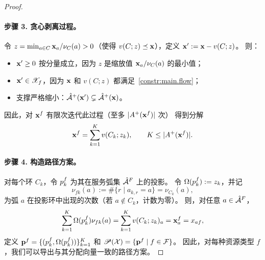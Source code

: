 \begin{proof}
\paragraph{步骤 3. 贪心剥离过程。}
令 $z=\min_{a\in C}\assignmentVector_a/\nu_{C}(a)>0$（使得 $v(C;z)\vectorLe \assignmentVector$），定义 $\assignmentVector':=\assignmentVector-v(C;z)$。
则：
\begin{itemize}
\item $\assignmentVector'\ge0$ 按分量成立，因为 $z$ 是缩放值 $\assignmentVector_a/\nu_C(a)$ 的最小值；
\item $\assignmentVector'\in\feasibleSet_f$，因为 $\assignmentVector$ 和 $v(C;z)$ 都满足~\eqref{constr:main.flow}；
\item 支撑严格缩小：$\arcSet^+(\assignmentVector')\subsetneq \arcSet^+(\assignmentVector)$。
\end{itemize}
因此，对 $\assignmentVector^f$ 有限次迭代此过程（至多 $|A^+(\assignmentVector^f)|$ 次）
得到分解
\[
\assignmentVector^f=\sum_{k=1}^{K}v(C_k;z_k),\qquad K\le|A^+(\assignmentVector^f)|.
\]

\paragraph{步骤 4. 构造路径方案。}
对每个环 $C_k$，令 $\pathInRoute{f}{k}$ 为其在服务弧集 $\flightArc$ 上的投影。
令 $\routeAmount{\pathInRoute{f}{k}}:=z_k$，并记
\[
    \nu_{fk}(a)
        := \#\{r\mid a_{k,r}=a\}
        = \nu_{C_k}(a),
\]
为弧 $a$ 在投影环中出现的次数（若 $a\notin C_k$，计数为零）。
则，对任意 $a\in\flightArc$，
\[
\sum_{k=1}^{K}\routeAmount{\pathInRoute{f}{k}}\nu_{fk}(a)
=\sum_{k=1}^{K}v(C_k;z_k)_a
=\assignmentVector^f_a
=\fleetAssignVar_{af},
\]
定义
$\route{f}=\{(\pathInRoute{f}{k},\routeAmount{\pathInRoute{f}{k}})\}_{k=1}^{K}$
和
$\routingPlan(\solution)=\{\route{f}\mid f\in\fleetSet\}$。
因此，对每种资源类型 $f$，我们可以导出与其分配向量一致的路径方案。
\end{proof}